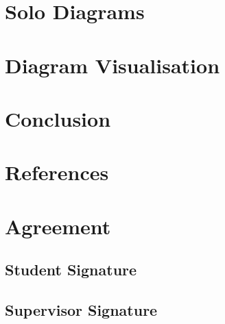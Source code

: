 \documentclass{article}
\begin{document}
    \section{Solo Diagrams}
        
        

    \section{Diagram Visualisation}
        

    \section{Conclusion}

    \section{References}
        

    \section{Agreement}
        \subsection{Student Signature}
            \vspace{1in}

        \subsection{Supervisor Signature}
            \vspace{1in}
\end{document}
